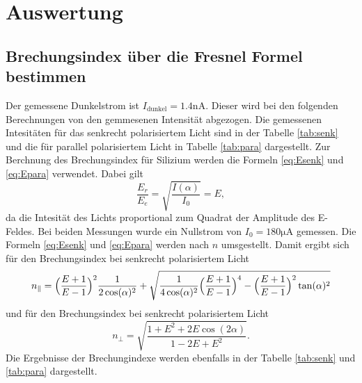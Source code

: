 \section{Auswertung}
\label{sec:Auswertung}

\subsection{Brechungsindex über die Fresnel Formel bestimmen}
Der gemessene Dunkelstrom ist $I_\text{dunkel} = 1.4 \unit{\nano\ampere}$. Dieser wird bei den folgenden Berechnungen von den gemmesenen Intensität abgezogen.
Die gemessenen Intesitäten für das senkrecht polarisiertem Licht sind in der Tabelle \ref{tab:senk} und 
die für parallel polarisiertem Licht in Tabelle \ref{tab:para} dargestellt.
Zur Berchnung des Brechungsindex für Silizium werden die Formeln \ref{eq:Esenk} und \ref{eq:Epara} verwendet.
Dabei gilt 
\begin{equation*}
  \frac{E_r}{E_e} = \sqrt{\frac{I(\alpha)}{I_0}} = E,
\end{equation*}
da die Intesität des Lichts proportional zum Quadrat der Amplitude des E-Feldes.
Bei beiden Messungen wurde ein Nullstrom von $I_0 = 180 \unit{\micro\ampere}$ gemessen.
Die Formeln \ref{eq:Esenk} und \ref{eq:Epara} werden nach $n$ umsgestellt.
Damit ergibt sich für den Brechungsindex bei senkrecht polarisiertem Licht
\begin{equation}
  n_\parallel = \Bigl(\frac{E+1}{E-1}\Bigr)^2\frac{1}{2 \cos(\alpha)^2}+\sqrt{\frac{1}{4 \cos(\alpha)^2}\Bigl(\frac{E+1}{E-1}\Bigr)^4-\Bigl(\frac{E+1}{E-1}\Bigr)^2 \tan(\alpha)^2}
\end{equation}
und für den Brechungsindex bei senkrecht polarisiertem Licht
\begin{equation}
  n_\perp = \sqrt{\frac{1+ E^2+ 2 E \cos(2 \alpha)}{1- 2 E+ E^2}}.
\end{equation}
Die Ergebnisse der Brechungindexe werden ebenfalls in der Tabelle \ref{tab:senk} und \ref{tab:para} dargestellt.

